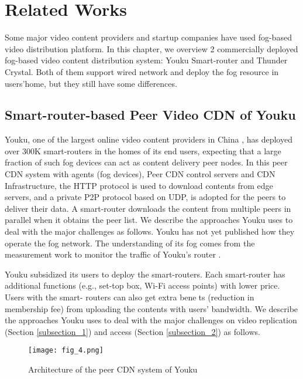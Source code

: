 \chapter{Related Works}
\label{chap:chap-two}
Some major video content providers and startup companies have used fog-based
video distribution platform. In this chapter, we overview 2 commercially deployed fog-based
video content distribution system: Youku Smart-router  and Thunder Crystal.
Both of them support wired network and deploy the fog resource in users'home,
but they still have some differences.

\section{Smart-router-based Peer Video CDN of Youku}
Youku, one of the largest online video content providers in China \citep{Li2011Measuring}, has deployed over
300K smart-routers in the homes of its end users, expecting that a large fraction of such fog
devices can act as content delivery peer nodes. In this peer CDN system with agents (fog
devices), Peer CDN control servers and CDN Infrastructure, the HTTP protocol is used to
download contents from edge servers, and a private P2P protocol based on UDP, is adopted
for the peers to deliver their data. A smart-router downloads the content from multiple
peers in parallel when it obtains the peer list. We describe the approaches Youku uses to
deal with the major challenges as follows. Youku has not yet published how they operate the
fog network. The understanding of its fog comes from the measurement work to monitor the
traffic of Youku's router \citep{Ma2016Understanding}.

Youku subsidized its users to deploy the smart-routers. Each smart-router has additional
functions (e.g., set-top box, Wi-Fi access points) with lower price. Users with the smart-
routers can also get extra benets (reduction in membership fee) from uploading the contents
with users' bandwidth. We describe the approaches Youku uses to deal with the major
challenges on video replication (Section \ref{subsection_1}) and access (Section \ref{subsection_2})
as follows.

\begin{figure}[htbp]
\centering
	  \texttt{[image: fig\_4.png]}
    \caption{Architecture of the peer CDN system of Youku}
 \label{fig_4}
\end{figure}


